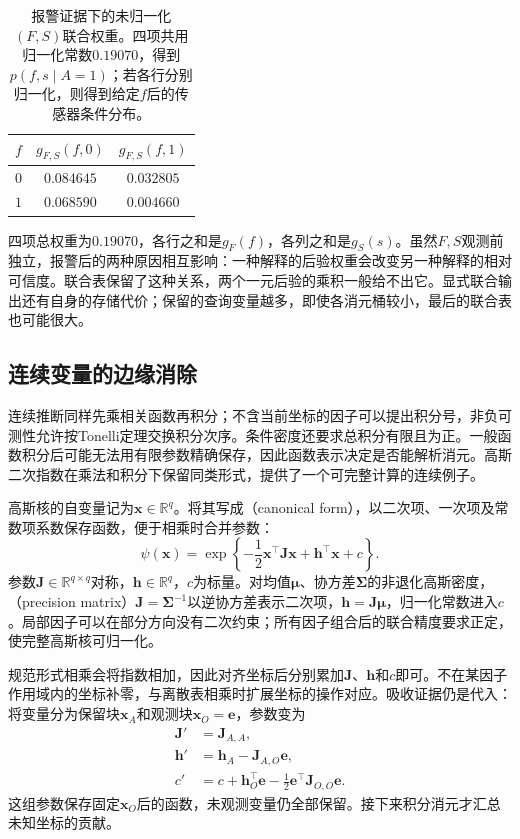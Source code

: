 \begin{table}[htbp]
  \centering
  \begin{tabular}{ccc}
    \toprule
    $f$ & $g_{F,S}(f,0)$ & $g_{F,S}(f,1)$\\
    \midrule
    $0$ & $0.084645$ & $0.032805$\\
    $1$ & $0.068590$ & $0.004660$\\
    \bottomrule
  \end{tabular}
  \caption{报警证据下的未归一化$(F,S)$联合权重。四项共用归一化常数$0.19070$，得到$p(f,s\mid A=1)$；若各行分别归一化，则得到给定$f$后的传感器条件分布。}
  \label{tab:pgm-elimination-joint-query}
\end{table}

四项总权重为$0.19070$，各行之和是$g_F(f)$，各列之和是$g_S(s)$。虽然$F,S$观测前独立，报警后的两种原因相互影响：一种解释的后验权重会改变另一种解释的相对可信度。联合表保留了这种关系，两个一元后验的乘积一般给不出它。显式联合输出还有自身的存储代价；保留的查询变量越多，即使各消元桶较小，最后的联合表也可能很大。

\subsection{连续变量的边缘消除}
\label{sec:pgm-elimination-gaussian}

连续推断同样先乘相关函数再积分；不含当前坐标的因子可以提出积分号，非负可测性允许按Tonelli定理交换积分次序。条件密度还要求总积分有限且为正。一般函数积分后可能无法用有限参数精确保存，因此函数表示决定是否能解析消元。高斯二次指数在乘法和积分下保留同类形式，提供了一个可完整计算的连续例子。

高斯核的自变量记为$\bm{x}\in\mathbb{R}^{q}$。将其写成（canonical form），以二次项、一次项及常数项系数保存函数，便于相乘时合并参数：
\begin{equation}
  \psi(\bm{x})
  =\exp\!\left\{-\frac12\bm{x}^{\top}\bm{J}\bm{x}
                  +\bm{h}^{\top}\bm{x}+c\right\}.
  \label{eq:pgm-elimination-gaussian-canonical}
\end{equation}
参数$\bm{J}\in\mathbb{R}^{q\times q}$对称，$\bm{h}\in\mathbb{R}^{q}$，$c$为标量。对均值$\bm{\mu}$、协方差$\bm{\Sigma}$的非退化高斯密度，（precision matrix）$\bm{J}=\bm{\Sigma}^{-1}$以逆协方差表示二次项，$\bm{h}=\bm{J}\bm{\mu}$，归一化常数进入$c$。局部因子可以在部分方向没有二次约束；所有因子组合后的联合精度要求正定，使完整高斯核可归一化。

规范形式相乘会将指数相加，因此对齐坐标后分别累加$\bm{J}$、$\bm{h}$和$c$即可。不在某因子作用域内的坐标补零，与离散表相乘时扩展坐标的操作对应。吸收证据仍是代入：将变量分为保留块$\bm{x}_A$和观测块$\bm{x}_O=\bm{e}$，参数变为
\[
  \begin{aligned}
    \bm{J}'&=\bm{J}_{A,A},\\
    \bm{h}'&=\bm{h}_A-\bm{J}_{A,O}\bm{e},\\
    c'&=c+\bm{h}_O^{\top}\bm{e}
       -\frac12\bm{e}^{\top}\bm{J}_{O,O}\bm{e}.
  \end{aligned}
\]
这组参数保存固定$\bm{x}_O$后的函数，未观测变量仍全部保留。接下来积分消元才汇总未知坐标的贡献。

